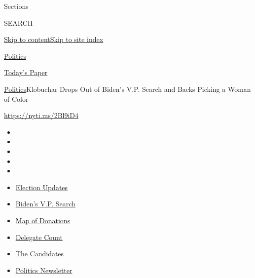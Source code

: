Sections

SEARCH

\protect\hyperlink{site-content}{Skip to
content}\protect\hyperlink{site-index}{Skip to site index}

\href{https://www.nytimes3xbfgragh.onion/section/politics}{Politics}

\href{https://myaccount.nytimes3xbfgragh.onion/auth/login?response_type=cookie\&client_id=vi}{}

\href{https://www.nytimes3xbfgragh.onion/section/todayspaper}{Today's
Paper}

\href{/section/politics}{Politics}\textbar{}Klobuchar Drops Out of
Biden's V.P. Search and Backs Picking a Woman of Color

\href{https://nyti.ms/2Bl9iD4}{https://nyti.ms/2Bl9iD4}

\begin{itemize}
\item
\item
\item
\item
\item
\end{itemize}

\begin{itemize}
\item
  \href{https://www.nytimes3xbfgragh.onion/2020/08/03/us/elections/biden-vs-trump.html?action=click\&pgtype=Article\&state=default\&region=TOP_BANNER\&context=storylines_menu}{Election
  Updates}
\item
  \href{https://www.nytimes3xbfgragh.onion/article/biden-vice-president-2020.html?action=click\&pgtype=Article\&state=default\&region=TOP_BANNER\&context=storylines_menu}{Biden's
  V.P. Search}
\item
  \href{https://www.nytimes3xbfgragh.onion/interactive/2020/07/24/us/politics/trump-biden-campaign-donors.html?action=click\&pgtype=Article\&state=default\&region=TOP_BANNER\&context=storylines_menu}{Map
  of Donations}
\item
  \href{https://www.nytimes3xbfgragh.onion/interactive/2020/us/elections/delegate-count-primary-results.html?action=click\&pgtype=Article\&state=default\&region=TOP_BANNER\&context=storylines_menu}{Delegate
  Count}
\item
  \href{https://www.nytimes3xbfgragh.onion/interactive/2019/us/politics/2020-presidential-candidates.html?action=click\&pgtype=Article\&state=default\&region=TOP_BANNER\&context=storylines_menu}{The
  Candidates}
\item
  \href{https://www.nytimes3xbfgragh.onion/newsletters/politics?action=click\&pgtype=Article\&state=default\&region=TOP_BANNER\&context=storylines_menu}{Politics
  Newsletter}
\end{itemize}

